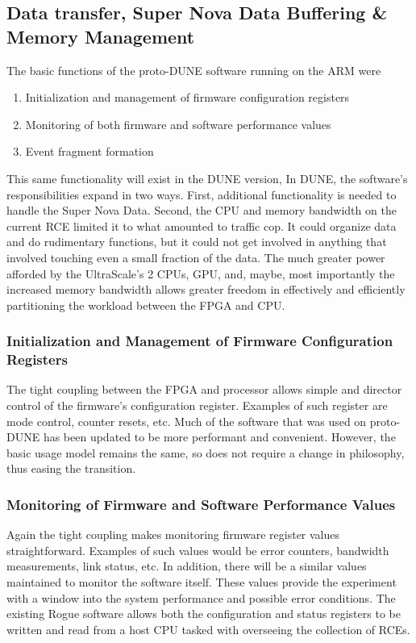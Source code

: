 \subsection{Data transfer, Super Nova Data Buffering \& Memory Management}

The basic functions of the proto-DUNE software running on the ARM were
\begin{enumerate}
   \item Initialization and management of firmware configuration registers
   \item Monitoring of both firmware and software performance values
   \item Event fragment formation
\end{enumerate}

This same functionality will exist in the DUNE version, In DUNE, the software's responsibilities expand in two ways. First, additional functionality is needed to handle the Super Nova Data.  Second, the CPU and memory bandwidth on the current RCE limited it to what amounted to traffic cop. It could organize data and do rudimentary functions, but it could not get involved in anything that involved touching even a small fraction of the data. The much greater power afforded by the UltraScale's 2 CPUs, GPU, and, maybe, most importantly the increased memory bandwidth allows greater freedom in effectively and efficiently partitioning the workload between the FPGA and CPU.

\subsubsection{Initialization and Management of Firmware Configuration Registers}
The tight coupling between the FPGA and processor allows simple and director control of the firmware's configuration register. Examples of such register are mode control, counter resets, etc. Much of the software that was used on proto-DUNE has been updated to be more performant and convenient.  However, the basic usage model remains the same, so does not require a change in philosophy, thus easing the transition.

\subsubsection{Monitoring of Firmware and Software Performance Values}
Again the tight coupling makes monitoring firmware register values straightforward.  Examples of such values would be error counters, bandwidth measurements, link status, etc.  In addition, there will be a similar values maintained to monitor the software itself.  These values provide the experiment with a window into the system performance and possible error conditions.  
The existing Rogue software allows both the configuration and status registers to be written and read from a host CPU tasked with overseeing the collection of RCEs.

